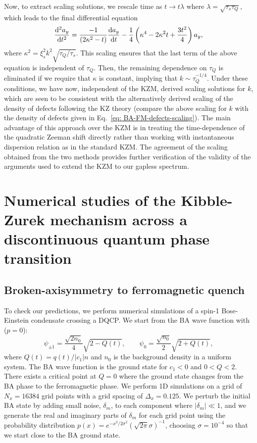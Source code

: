 Now, to extract scaling solutions, we rescale time as \(t\rightarrow t\lambda \)
where \(\lambda = \sqrt{\tau_s\tau_Q}\), which leads to the final differential
equation
\begin{align} \label{eq: eqn-scaled-lin}
    \dv[2]{a_y}{t} = \frac{-1}{\left( 2\kappa^2 - t\right)}\dv{a_y}{t}
    -\frac{1}{4} \left( \kappa^4 - 2\kappa^2 t + \frac{3 t^2}{4} \right)a_y,
\end{align}
where \(\kappa^2 = \xi_s^2 k^2 \sqrt{\tau_Q/\tau_s}\).
This scaling ensures that the last term of the above equation is independent of
\(\tau_Q\).
Then, the remaining dependence on \(\tau_Q\) is eliminated if we require that
\(\kappa \) is constant, implying that \(k \sim \tau_Q^{-1/4}\).
Under these conditions, we have now, independent of the KZM, derived scaling
solutions for \(k\), which are seen to be consistent with the alternatively
derived scaling of the density of defects following the KZ theory (compare the
above scaling for \(k\) with the density of defects given in
Eq.~\eqref{eq: BA-FM-defects-scaling}).
The main advantage of this approach over the KZM is in treating the
time-dependence of the quadratic Zeeman shift directly rather than working with
instantaneous dispersion relation as in the standard KZM\@.
The agreement of the scaling obtained from the two methods provides further
verification of the validity of the arguments used to extend the KZM to our
gapless spectrum.

\section{Numerical studies of the Kibble-Zurek mechanism across a discontinuous
quantum phase transition}
\subsection{Broken-axisymmetry to ferromagnetic quench}
To check our predictions, we perform numerical simulations of a spin-1
Bose-Einstein condensate crossing a DQCP\@.
We start from the BA wave function with (\( p=0 \)):
\begin{equation}
    \psi_{\pm 1} = \frac{\sqrt{2n_0}}{4}\sqrt{2 - Q(t)}, \qquad
    \psi_0 = \frac{\sqrt{n_0}}{2}\sqrt{2 + Q(t)},
    \label{eq: BA-initial-wavefunction}
\end{equation}
where \(Q(t)=q(t)/|c_1|n\) and \(n_0\) is the background density in a uniform
system.
The BA wave function is the ground state for \(c_1 < 0\) and \(0 < Q < 2\).
There exists a critical point at \( Q = 0 \) where the ground state changes from
the BA phase to the ferromagnetic phase.
We perform 1D simulations on a grid of \(N_x = 16384\) grid points with a grid
spacing of \(\Delta_x = 0.125\).
We perturb the initial BA state by adding small noise, \(\delta_m\), to each
component where \(|\delta_m| \ll 1\), and we generate the real and imaginary
parts of \(\delta_m\) for each grid point using the probability distribution
\(p(x) = e^{-x^2/2\sigma^2}{(\sqrt{2\pi}\sigma)}^{-1}\), choosing
\(\sigma=10^{-4}\) so that we start close to the BA ground state.

